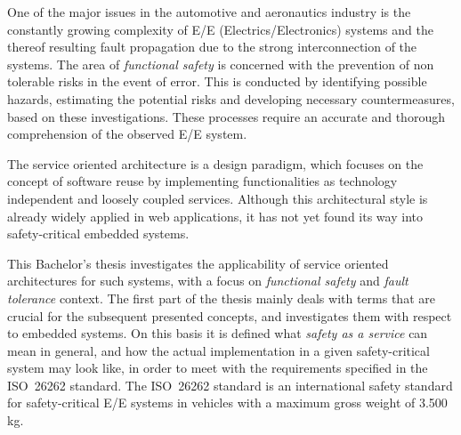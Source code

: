 One of the major issues in the automotive and aeronautics industry is the constantly growing complexity of E/E (Electrics/Electronics) systems and the thereof resulting fault propagation due to the strong interconnection of the systems. The area of \emph{functional safety} is concerned with the prevention of non tolerable risks in the event of error. This is conducted by identifying possible hazards, estimating the potential risks and developing necessary countermeasures, based on these investigations. These processes require an accurate and thorough comprehension of the observed E/E system.

The service oriented architecture is a design paradigm, which focuses on the concept of software reuse by implementing functionalities as technology independent and loosely coupled services. Although this architectural style is already widely applied in web applications, it has not yet found its way into safety-critical embedded systems.

This Bachelor's thesis investigates the applicability of service oriented architectures for such systems, with a focus on \emph{functional safety} and \emph{fault tolerance} context. The first part of the thesis mainly deals with terms that are crucial for the subsequent presented concepts, and investigates them with respect to embedded systems. On this basis it is defined what \emph{safety as a service} can mean in general, and how the actual implementation in a given safety-critical system may look like, in order to meet with the requirements specified in the \mbox{ISO 26262} standard. The \mbox{ISO 26262} standard is an international safety standard for safety-critical E/E systems in vehicles with a maximum gross weight of 3.500 kg.